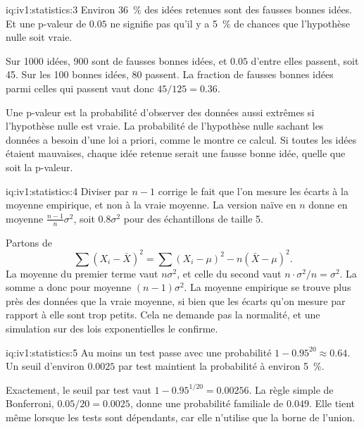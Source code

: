 \begin{solution}{iq:iv1:statistics:3}
Environ 36~\% des idées retenues sont des fausses bonnes idées. Et une p-valeur de $0.05$ ne signifie pas qu'il y a 5~\% de chances que l'hypothèse nulle soit vraie.

Sur 1000 idées, 900 sont de fausses bonnes idées, et $0.05$ d'entre elles passent, soit 45. Sur les 100 bonnes idées, 80 passent. La fraction de fausses bonnes idées parmi celles qui passent vaut donc $45/125 = 0.36$.

Une p-valeur est la probabilité d'observer des données aussi extrêmes si l'hypothèse nulle est vraie. La probabilité de l'hypothèse nulle sachant les données a besoin d'une loi a priori, comme le montre ce calcul. Si toutes les idées étaient mauvaises, chaque idée retenue serait une fausse bonne idée, quelle que soit la p-valeur.

\end{solution}

\begin{solution}{iq:iv1:statistics:4}
Diviser par $n - 1$ corrige le fait que l'on mesure les écarts à la moyenne empirique, et non à la vraie moyenne. La version naïve en $n$ donne en moyenne $\frac{n - 1}{n}\sigma^2$, soit $0.8\sigma^2$ pour des échantillons de taille 5.

Partons de
\[
\sum (X_i - \bar{X})^2 = \sum (X_i - \mu)^2 - n(\bar{X} - \mu)^2.
\]
La moyenne du premier terme vaut $n\sigma^2$, et celle du second vaut $n \cdot \sigma^2/n = \sigma^2$. La somme a donc pour moyenne $(n - 1)\sigma^2$. La moyenne empirique se trouve plus près des données que la vraie moyenne, si bien que les écarts qu'on mesure par rapport à elle sont trop petits. Cela ne demande pas la normalité, et une simulation sur des lois exponentielles le confirme.

\end{solution}

\begin{solution}{iq:iv1:statistics:5}
Au moins un test passe avec une probabilité $1 - 0.95^{20} \approx 0.64$. Un seuil d'environ $0.0025$ par test maintient la probabilité à environ 5~\%.

Exactement, le seuil par test vaut $1 - 0.95^{1/20} = 0.00256$. La règle simple de Bonferroni, $0.05/20 = 0.0025$, donne une probabilité familiale de $0.049$. Elle tient même lorsque les tests sont dépendants, car elle n'utilise que la borne de l'union.

\end{solution}

